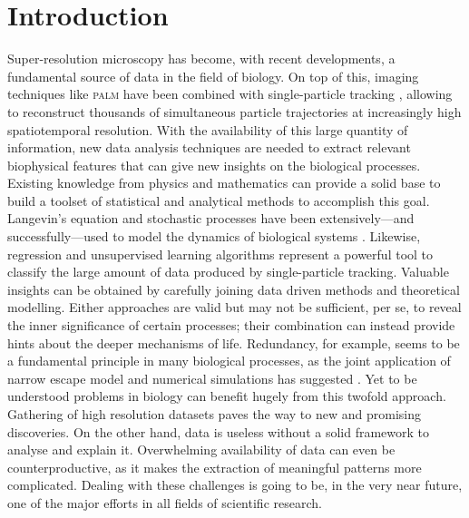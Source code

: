 
\chapter{Introduction}\label{sec:introduction}

Super-resolution microscopy has become, with recent developments, a fundamental source of data in the field of biology. On top of this, imaging techniques like \textsc{palm} have been combined with single-particle tracking \cite{sptpalm}, allowing to reconstruct thousands of simultaneous particle trajectories at increasingly high spatiotemporal resolution. With the availability of this large quantity of information, new data analysis techniques are needed to extract relevant biophysical features that can give new insights on the biological processes. Existing knowledge from physics and mathematics can provide a solid base to build a toolset of statistical and analytical methods to accomplish this goal. Langevin's equation and stochastic processes have been extensively---and successfully---used to model the dynamics of biological systems \cite{schuss2010}. Likewise, regression and unsupervised learning algorithms represent a powerful tool to classify the large amount of data produced by single-particle tracking. Valuable insights can be obtained by carefully joining data driven methods and theoretical modelling. Either approaches are valid but may not be sufficient, per se, to reveal the inner significance of certain processes; their combination can instead provide hints about the deeper mechanisms of life. Redundancy, for example, seems to be a fundamental principle in many biological processes, as the joint application of narrow escape model and numerical simulations has suggested \cite{reynaud2015, schuss2017, basnayake2018}. Yet to be understood problems in biology can benefit hugely from this twofold approach. Gathering of high resolution datasets paves the way to new and promising discoveries. On the other hand, data is useless without a solid framework to analyse and explain it. Overwhelming availability of data can even be counterproductive, as it makes the extraction of meaningful patterns more complicated. Dealing with these challenges is going to be, in the very near future, one of the major efforts in all fields of scientific research.

